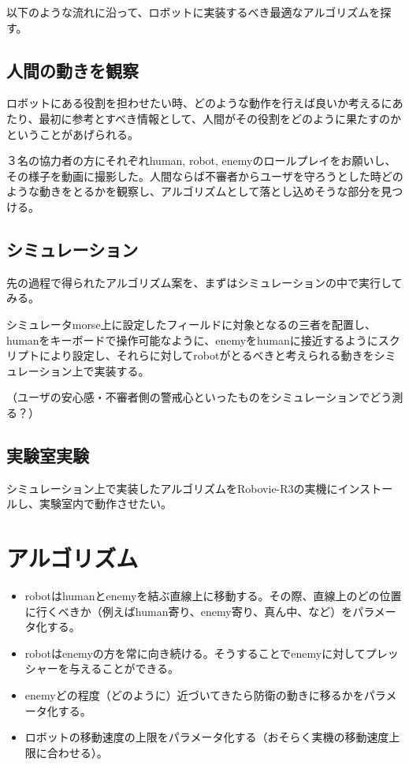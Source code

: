 \documentclass[twocolumn]{jsarticle}
\begin{document}
以下のような流れに沿って、ロボットに実装するべき最適なアルゴリズムを探す。

\subsection{人間の動きを観察}
ロボットにある役割を担わせたい時、どのような動作を行えば良いか考えるにあたり、最初に参考とすべき情報として、人間がその役割をどのように果たすのかということがあげられる。

３名の協力者の方にそれぞれhuman, robot, enemyのロールプレイをお願いし、その様子を動画に撮影した。人間ならば不審者からユーザを守ろうとした時どのような動きをとるかを観察し、アルゴリズムとして落とし込めそうな部分を見つける。

\subsection{シミュレーション}
先の過程で得られたアルゴリズム案を、まずはシミュレーションの中で実行してみる。

シミュレータmorse上に設定したフィールドに対象となるの三者を配置し、humanをキーボードで操作可能なように、enemyをhumanに接近するようにスクリプトにより設定し、それらに対してrobotがとるべきと考えられる動きをシミュレーション上で実装する。

（ユーザの安心感・不審者側の警戒心といったものをシミュレーションでどう測る？）

\subsection{実験室実験}
シミュレーション上で実装したアルゴリズムをRobovie-R3の実機にインストールし、実験室内で動作させたい。

\section{アルゴリズム}
\begin{itemize}
	\item robotはhumanとenemyを結ぶ直線上に移動する。その際、直線上のどの位置に行くべきか（例えばhuman寄り、enemy寄り、真ん中、など）をパラメータ化する。
	\item robotはenemyの方を常に向き続ける。そうすることでenemyに対してプレッシャーを与えることができる。
	\item enemyどの程度（どのように）近づいてきたら防衛の動きに移るかをパラメータ化する。
	\item ロボットの移動速度の上限をパラメータ化する（おそらく実機の移動速度上限に合わせる）。
\end{itemize}
\end{document}
